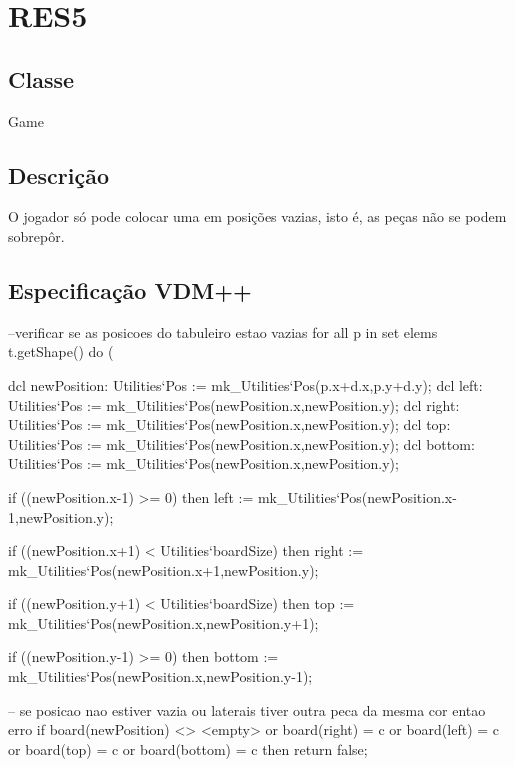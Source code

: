 \section{RES5}
\subsection{Classe}
Game
\subsection{Descrição}
O jogador só pode colocar uma em posições vazias, isto é, as peças não se podem sobrepôr.
\subsection{Especificação VDM++}
\begin{vdm_al}
--verificar se as posicoes do tabuleiro estao vazias
for all p in set elems t.getShape() do (

  dcl newPosition: Utilities`Pos := mk_Utilities`Pos(p.x+d.x,p.y+d.y);
  dcl left: Utilities`Pos := mk_Utilities`Pos(newPosition.x,newPosition.y);
  dcl right: Utilities`Pos := mk_Utilities`Pos(newPosition.x,newPosition.y);              
  dcl top: Utilities`Pos := mk_Utilities`Pos(newPosition.x,newPosition.y);
  dcl bottom: Utilities`Pos := mk_Utilities`Pos(newPosition.x,newPosition.y);
  
  if ((newPosition.x-1) >= 0) then
    left := mk_Utilities`Pos(newPosition.x-1,newPosition.y);
  
  if ((newPosition.x+1) < Utilities`boardSize) then  
    right := mk_Utilities`Pos(newPosition.x+1,newPosition.y);
    
  if ((newPosition.y+1) < Utilities`boardSize) then              
    top := mk_Utilities`Pos(newPosition.x,newPosition.y+1);
    
  if ((newPosition.y-1) >= 0) then
    bottom := mk_Utilities`Pos(newPosition.x,newPosition.y-1);

  -- se posicao nao estiver vazia ou laterais tiver outra peca da mesma cor entao erro
  if board(newPosition) <> <empty> or board(right) = c or board(left) = c or board(top) = c or board(bottom) = c then
    return false;
\end{vdm_al}
